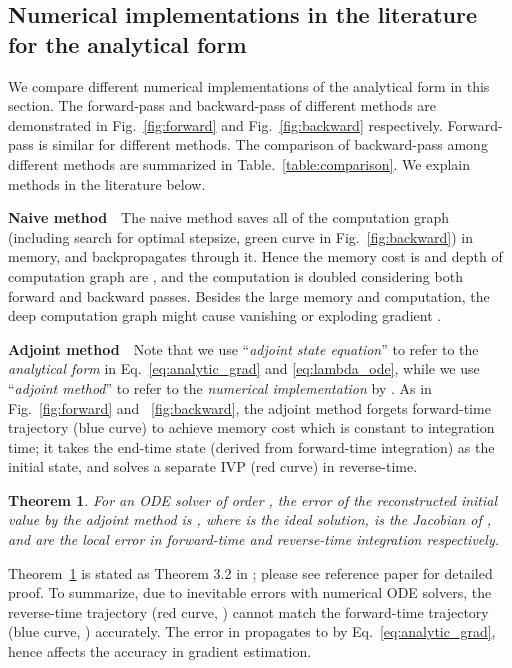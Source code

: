\documentclass{article} \usepackage{iclr2021_conference,times}
\newtheorem{theorem}{Theorem}[section]
\begin{document}
\subsection{Numerical implementations in the literature for the analytical form}
We compare different numerical implementations of the analytical form in this section. The forward-pass and backward-pass of different methods are demonstrated in Fig.~\ref{fig:forward} and Fig.~\ref{fig:backward} respectively. Forward-pass is similar for different methods. 
The comparison of backward-pass among different methods are summarized in Table.~\ref{table:comparison}. We explain methods in the literature below.

\textbf{Naive method}\ \ The naive method saves all of the computation graph (including search for optimal stepsize, green curve in Fig.~\ref{fig:backward}) in memory, and backpropagates through it. Hence the memory cost is  and depth of computation graph are , and the computation is doubled considering both forward and backward passes. Besides the large memory and computation, the deep computation graph might cause vanishing or exploding gradient \citep{pascanu2013difficulty}.

\textbf{Adjoint method}\ \ Note that we use ``\textit{adjoint state equation}'' to refer to the \textit{analytical form} in Eq.~\ref{eq:analytic_grad} and \ref{eq:lambda_ode}, while we use ``\textit{adjoint method}'' to refer to the \textit{numerical implementation} by \citet{chen2018neural}. As in Fig.~\ref{fig:forward} and ~\ref{fig:backward}, the adjoint method forgets forward-time trajectory (blue curve) to achieve memory cost  which is constant to integration time; it takes the end-time state (derived from forward-time integration) as the initial state, and solves a separate IVP (red curve) in reverse-time.\begin{theorem}\citep{zhuang2020adaptive}
\label{thm:error_adj}
For an ODE solver of order , the error of the reconstructed initial value by the adjoint method is , where  is the ideal solution,  is the Jacobian of ,  and  are the local error in forward-time and reverse-time integration respectively.
\end{theorem}
Theorem~\ref{thm:error_adj} is stated as Theorem 3.2 in \citet{zhuang2020adaptive}; please see reference paper for detailed proof. To summarize, due to inevitable errors with numerical ODE solvers, the reverse-time trajectory (red curve, ) cannot match the forward-time trajectory (blue curve, ) accurately. The error in  propagates to  by Eq.~\ref{eq:analytic_grad}, hence affects the accuracy in gradient estimation.
\end{document}
